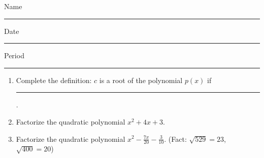 \documentclass[10pt]{article}
\title{}
\date{}
\begin{document}
\noindent
{\large
Name \rule{16em}{.5pt} Date \rule{8em}{.5pt} Period \rule{2em}{.5pt}
}
\vspace{1em}

\begin{enumerate}
    \item Complete the definition: $c$ is a root of the polynomial $p(x)$ if \rule{10em}{0.5pt} .
    \item Factorize the quadratic polynomial \(x^2 + 4x + 3\).
    \item Factorize the quadratic polynomial \(\displaystyle x^2 - \frac{7x}{20}- \frac{3}{10}\). (Fact: \(\sqrt{529} = 23\), \(\sqrt{400} = 20\))
\end{enumerate}
\end{document}
